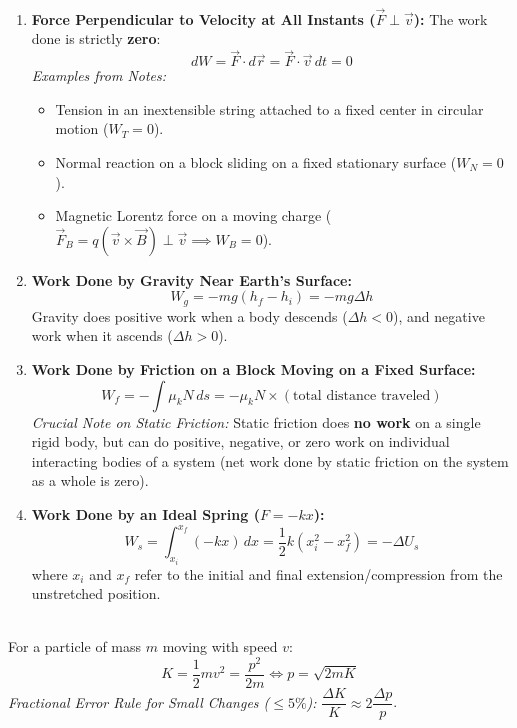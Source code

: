 \documentclass[11pt,a4paper]{article}
\begin{document}
\vspace{5pt}
\noindent{\large\textbf{\textsf{\textcolor{primaryDark}{1.3 Specific Work Evaluations (Key Cases from Notes)}}}}\\[3pt]
\begin{enumerate}[label=(\roman*),leftmargin=14pt,itemsep=2.5pt]
  \item \textbf{Force Perpendicular to Velocity at All Instants ($\vec{F} \perp \vec{v}$):} The work done is strictly \textbf{zero}:
  \[
    dW = \vec{F}\cdot d\vec{r} = \vec{F}\cdot\vec{v}\,dt = 0
  \]
  \textit{Examples from Notes:}
  \begin{itemize}[leftmargin=12pt,itemsep=1pt]
    \item Tension in an inextensible string attached to a fixed center in circular motion ($W_T = 0$).
    \item Normal reaction on a block sliding on a fixed stationary surface ($W_N = 0$).
    \item Magnetic Lorentz force on a moving charge ($\vec{F}_B = q(\vec{v}\times\vec{B}) \perp \vec{v} \implies W_B = 0$).
  \end{itemize}
  \item \textbf{Work Done by Gravity Near Earth's Surface:}
  \[
    W_g = -mg(h_f - h_i) = -mg \Delta h
  \]
  Gravity does positive work when a body descends ($\Delta h < 0$), and negative work when it ascends ($\Delta h > 0$).
  \item \textbf{Work Done by Friction on a Block Moving on a Fixed Surface:}
  \[
    W_f = -\int \mu_k N\,ds = -\mu_k N \times (\text{total distance traveled})
  \]
  \textit{Crucial Note on Static Friction:} Static friction does \textbf{no work} on a single rigid body, but can do positive, negative, or zero work on individual interacting bodies of a system (net work done by static friction on the system as a whole is zero).
  \item \textbf{Work Done by an Ideal Spring ($F = -kx$):}
  \[
    W_s = \int_{x_i}^{x_f} (-kx)\,dx = \frac{1}{2}k\left(x_i^2 - x_f^2\right) = -\Delta U_s
  \]
  where $x_i$ and $x_f$ refer to the initial and final extension/compression from the unstretched position.
\end{enumerate}

\vspace{5pt}
\noindent{\large\textbf{\textsf{\textcolor{primaryDark}{1.4 Relation Between Momentum and Kinetic Energy}}}}\\[3pt]
For a particle of mass $m$ moving with speed $v$:
\[
  K = \frac{1}{2}mv^2 = \frac{p^2}{2m} \iff p = \sqrt{2mK}
\]
\textit{Fractional Error Rule for Small Changes ($\le 5\%$):} $\dfrac{\Delta K}{K} \approx 2\dfrac{\Delta p}{p}$.
\end{document}
